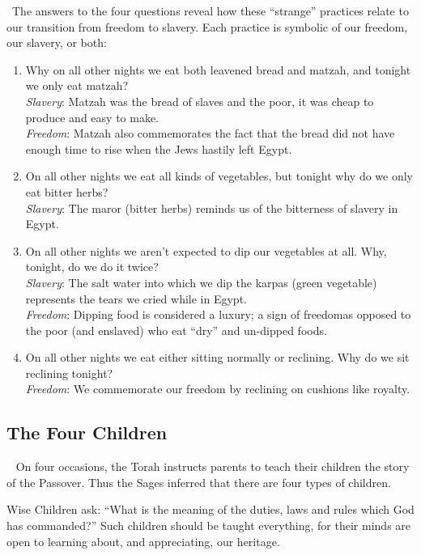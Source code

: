 \documentclass[12pt]{article}
\newcommand{\god}{God}
\newcommand{\newReading}{\faBook{}\ }
\begin{document}
\newReading The answers to the four questions reveal how these ``strange'' practices relate to our transition from freedom to slavery.  Each practice is symbolic of our freedom, our slavery, or both:
\begin{enumerate}
    \item Why on all other nights we eat both leavened bread and matzah, and tonight we only eat matzah? \\
    \textit{Slavery}: Matzah was the bread of slaves and the poor, it was cheap to produce and easy to make. \\
    \textit{Freedom}: Matzah also commemorates the fact that the bread did not have enough time to rise when the Jews hastily left Egypt.
    
    \item On all other nights we eat all kinds of vegetables, but tonight why do we only eat bitter herbs? \\
    \textit{Slavery}: The maror (bitter herbs) reminds us of the bitterness of slavery in Egypt.
    
    \item On all other nights we aren’t expected to dip our vegetables at all.  Why, tonight, do we do it twice? \\
    \textit{Slavery}: The salt water into which we dip the karpas (green vegetable) represents the tears we cried while in Egypt. \\
    \textit{Freedom}: Dipping food is considered a luxury; a sign of freedom\textemdash{}as opposed to the poor (and enslaved) who eat ``dry'' and un-dipped foods.
    
    \item On all other nights we eat either sitting normally or reclining. Why do we sit reclining tonight? \\
    \textit{Freedom}: We commemorate our freedom by reclining on cushions like royalty.
\end{enumerate}

\subsection*{The Four Children}
\newReading
On four occasions, the Torah instructs parents to teach their children the story of the Passover. Thus the Sages inferred that there are four types of children.

Wise Children ask: ``What is the meaning of the duties, laws and rules which {\god} has commanded?'' Such children should be taught everything, for their minds are open to learning about, and appreciating, our heritage.
\end{document}
